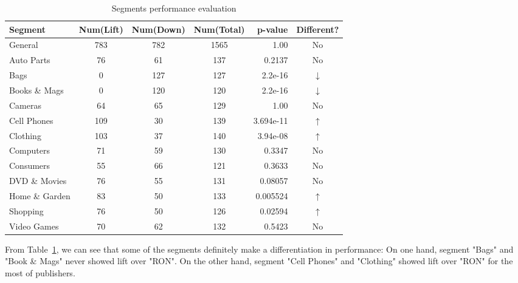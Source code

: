 \documentclass[12pt]{article}
\begin{document}
\begin{table}[ht!]
  \begin{center}
    \begin{tabular}{|l|c|c|c|r|c|}
      \hline
      Segment        & Num(Lift) & Num(Down) & Num(Total) & p-value   & Different?    \\ \hline
      General        &   783     &   782     &   1565     & 1.00      &  No           \\ \hline
      Auto Parts     &   76      &   61      &   137      & 0.2137    &  No           \\ \hline
      Bags           &   0       &   127     &   127      & 2.2e-16   &  $\downarrow$ \\ \hline
      Books \& Mags  &   0       &   120     &   120      & 2.2e-16   &  $\downarrow$ \\ \hline
      Cameras        &   64      &   65      &   129      & 1.00      &  No           \\ \hline
      Cell Phones    &   109     &   30      &   139      & 3.694e-11 &  $\uparrow$   \\ \hline
      Clothing       &   103     &   37      &   140      & 3.94e-08  &  $\uparrow$   \\ \hline
      Computers      &   71      &   59      &   130      & 0.3347    &  No           \\ \hline
      Consumers      &   55      &   66      &   121      & 0.3633    &  No           \\ \hline
      DVD \& Movies  &   76      &   55      &   131      & 0.08057   &  No           \\ \hline
      Home \& Garden &   83      &   50      &   133      & 0.005524  &  $\uparrow$   \\ \hline
      Shopping       &   76      &   50      &   126      & 0.02594   &  $\uparrow$   \\ \hline
      Video Games    &   70      &   62      &   132      & 0.5423    &  No           \\ \hline
    \end{tabular}
  \end{center}
  \caption{Segments performance evaluation \label{tab:p4}}
\end{table}

From Table~\ref{tab:p4}, we can see that some of the segments definitely make a differentiation in performance: On one hand, segment "Bags" and "Book \& Mags" never showed lift over "RON". On the other hand, segment "Cell Phones" and "Clothing" showed lift over "RON" for the most of publishers. \\
\end{document}
